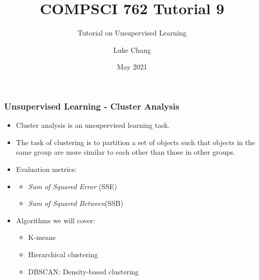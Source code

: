 \documentclass[aspectratio=169, 10pt]{beamer}
\title{COMPSCI 762 Tutorial 9}
\subtitle{Tutorial on Unsupervised Learning}
\author{Luke Chang}
\institute{The University of Auckland}
\date{May 2021}
\begin{document}
\frame{\titlepage}


        

\begin{frame}
\frametitle{Unsupervised Learning - Cluster Analysis}

\begin{itemize}
    \item Cluster analysis is an unsupervised learning task.
    \item The task of clustering is to partition a set of objects such that objects in the same group are more similar to each other than those in other groups.
    \item Evaluation metrics: 
    \item \begin{itemize}
        \item \textit{Sum of Squared Error} (SSE)
        \item \textit{Sum of Squared Between}(SSB)
    \end{itemize}
    \item Algorithms we will cover: 
        \begin{itemize}
            \item K-means
            \item Hierarchical clustering
            \item DBSCAN: Density-based clustering
        \end{itemize}
\end{itemize}

\end{frame}
\end{document}
